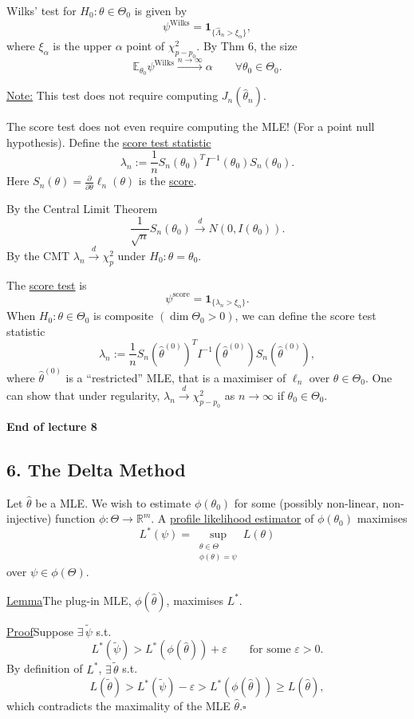 \documentclass[11pt,a4paper]{article}
\begin{document}
Wilks' test for $H_0:\theta\in\Theta_0$ is given by
\[
\psi^{\mathrm{Wilks}}=\mathbf1_{\{\hat\Lambda_n>\xi_\alpha\}},
\]
where $\xi_\alpha$ is the upper $\alpha$ point of $\chi_{p-p_0}^2$.
By Thm 6, the size
\[
\mathbb E_{\theta_0}\psi^{\mathrm{Wilks}}\xrightarrow{n\to\infty}\alpha
\qquad\forall\theta_0\in\Theta_0.
\]

\noindent\underline{Note:} This test does not require computing $J_n(\hat\theta_n)$.

The score test does not even require computing the MLE!
(For a point null hypothesis).
Define the \underline{score test statistic}
\[
\lambda_n:=\frac1n S_n(\theta_0)^T I^{-1}(\theta_0)S_n(\theta_0).
\]
Here $S_n(\theta)=\frac{\partial}{\partial\theta}\ell_n(\theta)$ is the \underline{score}.

By the Central Limit Theorem
\[
\frac1{\sqrt n} S_n(\theta_0)\xrightarrow{d}N(0,I(\theta_0)).
\]
By the CMT $\lambda_n\xrightarrow{d}\chi_p^2$ under
\underline{$H_0:\theta=\theta_0$}.

The \underline{score test} is
\[
\psi^{\mathrm{score}}=\mathbf1_{\{\lambda_n>\xi_\alpha\}}.
\]
When $H_0:\theta\in\Theta_0$ is composite $(\dim\Theta_0>0)$,
we can define the score test statistic
\[
\lambda_n:=\frac1n S_n(\hat\theta^{(0)})^T
I^{-1}(\hat\theta^{(0)})S_n(\hat\theta^{(0)}),
\]
where $\hat\theta^{(0)}$ is a ``restricted'' MLE, that is a maximiser of
$\ell_n$ over $\theta\in\Theta_0$.
One can show that under regularity,
$\lambda_n\xrightarrow{d}\chi_{p-p_0}^2$ as $n\to\infty$ if $\theta_0\in\Theta_0$.

\begin{center}
\textbf{End of lecture 8}
\end{center}

\subsection*{6. The Delta Method}

Let $\hat\theta$ be a MLE. We wish to estimate $\phi(\theta_0)$ for some
(possibly non-linear, non-injective) function $\phi:\Theta\to\mathbb R^m$.
A \underline{profile likelihood estimator} of $\phi(\theta_0)$ maximises
\[
L^*(\psi)=\sup_{\substack{\theta\in\Theta\\\phi(\theta)=\psi}}L(\theta)
\]
over $\psi\in\phi(\Theta)$.

\medskip
\noindent\underline{Lemma}\quad The plug-in MLE, $\phi(\hat\theta)$,
maximises $L^*$.

\noindent\underline{Proof}\quad Suppose $\exists\,\tilde\psi$ s.t.
\[
L^*(\tilde\psi)>L^*(\phi(\hat\theta))+\varepsilon
\qquad\text{for some }\varepsilon>0.
\]
By definition of $L^*$, $\exists\,\tilde\theta$ s.t.
\[
L(\tilde\theta)>L^*(\tilde\psi)-\varepsilon
>L^*(\phi(\hat\theta))\geq L(\hat\theta),
\]
which contradicts the maximality of the MLE $\hat\theta$.\hfill$\square$
\end{document}
